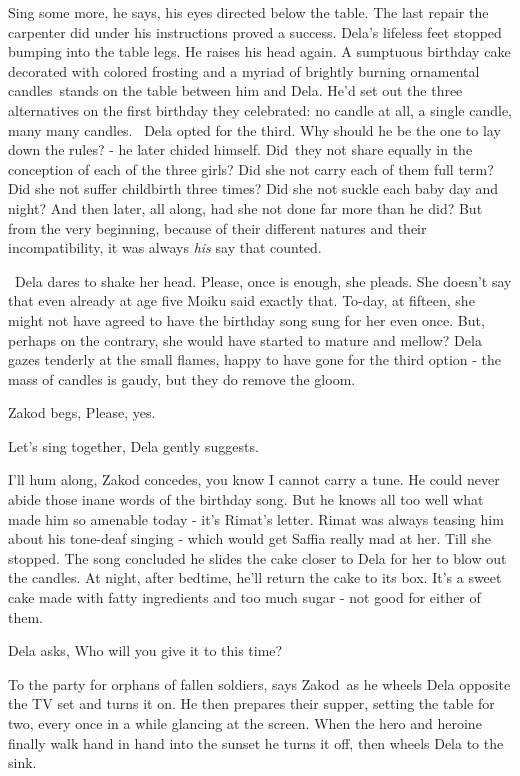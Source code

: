 \documentclass[12pt]{book}
\begin{document}
{\textquotedbl}Sing some more,{\textquotedbl} he says, his eyes directed below the table. The last repair the carpenter
did under his instructions proved a success. Dela's lifeless feet stopped bumping into the table legs. He raises his
head again. A sumptuous birthday cake decorated with colored frosting and a myriad of brightly burning ornamental
candles~stands on the table between him and Dela. He'd set out the three alternatives on the first birthday they
celebrated: no candle at all, a single candle, many many candles.~ Dela opted for the third. Why should he be the one
to lay down the rules? - he later chided himself. Did~they not share equally in the conception of each of the three
girls? Did she not carry each of them full term? Did she not suffer childbirth three times? Did she not suckle each
baby day and night? And then later, all along, had she not done far more than he did? But from the very beginning,
because of their different natures and their incompatibility, it was always \textit{his} say that counted.

~Dela dares to shake her head. {\textquotedbl}Please, once is enough,{\textquotedbl} she pleads. She doesn't say that
even already at age five Moiku said exactly that. To-day, at fifteen, she might not have agreed to have the birthday
song sung for her even once. But, perhaps on the contrary, she would have started to mature and mellow? Dela gazes
tenderly at the small flames, happy to have gone for the third option - the mass of candles is gaudy, but they do
remove the gloom.

Zakod begs, {\textquotedbl}Please, yes.{\textquotedbl}

{\textquotedbl}Let's sing together,{\textquotedbl} Dela gently suggests.

{\textquotedbl}I'll hum along,{\textquotedbl} Zakod concedes, {\textquotedbl}you know I cannot carry a
tune.{\textquotedbl} He could never abide those inane words of the birthday song. But he knows all too well what made
him so amenable today - it's Rimat's letter. Rimat was always teasing him about his tone-deaf singing - which would get
Saffia really mad at her. Till she stopped. The song concluded he slides the cake closer to Dela for her to blow out
the candles. At night, after bedtime, he'll return the cake to its box. It's a sweet cake made with fatty ingredients
and too much sugar - not good for either of them.

Dela asks, {\textquotedbl}Who will you give it to this time?{\textquotedbl}

{\textquotedbl}To the party for orphans of fallen soldiers,{\textquotedbl} says Zakod~as he wheels Dela opposite the TV
set and turns it on. He then prepares their supper, setting the table for two, every once in a while glancing at the
screen. When the hero and heroine finally walk hand in hand into the sunset he turns it off, then wheels Dela to the
sink.
\end{document}
